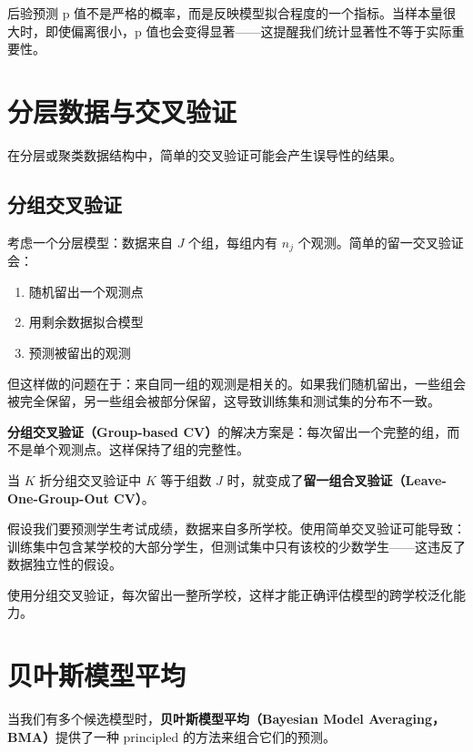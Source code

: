 \begin{Remark}
  后验预测 p 值不是严格的概率，而是反映模型拟合程度的一个指标。当样本量很大时，即使偏离很小，p 值也会变得显著——这提醒我们统计显著性不等于实际重要性。
\end{Remark}

\section{分层数据与交叉验证}

在分层或聚类数据结构中，简单的交叉验证可能会产生误导性的结果。

\subsection{分组交叉验证}

考虑一个分层模型：数据来自 $J$ 个组，每组内有 $n_j$ 个观测。简单的留一交叉验证会：

\begin{enumerate}
  \item 随机留出一个观测点
  \item 用剩余数据拟合模型
  \item 预测被留出的观测
\end{enumerate}

但这样做的问题在于：来自同一组的观测是相关的。如果我们随机留出，一些组会被完全保留，另一些组会被部分保留，这导致训练集和测试集的分布不一致。

\textbf{分组交叉验证（Group-based CV）}的解决方案是：每次留出一个完整的组，而不是单个观测点。这样保持了组的完整性。

当 $K$ 折分组交叉验证中 $K$ 等于组数 $J$ 时，就变成了\textbf{留一组合叉验证（Leave-One-Group-Out CV）}。

\begin{Example}[学校成绩预测]
  假设我们要预测学生考试成绩，数据来自多所学校。使用简单交叉验证可能导致：训练集中包含某学校的大部分学生，但测试集中只有该校的少数学生——这违反了数据独立性的假设。

  使用分组交叉验证，每次留出一整所学校，这样才能正确评估模型的跨学校泛化能力。
\end{Example}

\section{贝叶斯模型平均}

当我们有多个候选模型时，\textbf{贝叶斯模型平均（Bayesian Model Averaging，BMA）}提供了一种 principled 的方法来组合它们的预测。

